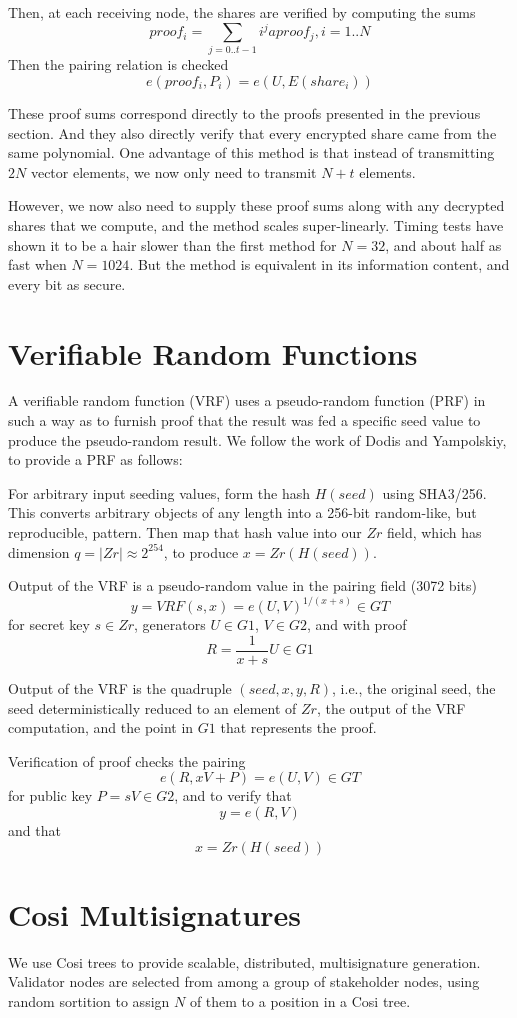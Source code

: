 \documentclass[article,oneside]{memoir}
\begin{document}
Then, at each receiving node, the shares are verified by computing the sums
$$ proof_i = \sum_{j=0..t-1} i^j aproof_j, i = 1..N$$
Then the pairing relation is checked
$$e(proof_i, P_i) = e(U,E(share_i))$$

These proof sums correspond directly to the proofs presented in the previous section. And they also directly verify that every encrypted share came from the same polynomial. One advantage of this method is that instead of transmitting $2 N$ vector elements, we now only need to transmit $N+t$ elements.

However, we now also need to supply these proof sums along with any decrypted shares that we compute, and the method scales super-linearly. Timing tests have shown it to be a hair slower than the first method for $N=32$, and about half as fast when $N=1024$. But the method is equivalent in its information content, and every bit as secure.

\chapter{Verifiable Random Functions}
A verifiable random function (VRF)\cite{vrf2} uses a pseudo-random function (PRF) in such a way as to furnish proof that the result was fed a specific seed value to produce the pseudo-random result. We follow the work of Dodis and Yampolskiy\cite{vrf}, to provide a PRF as follows:

For arbitrary input seeding values, form the hash $H(seed)$ using SHA3/256. This converts arbitrary objects of any length into a 256-bit random-like, but reproducible, pattern. Then map that hash value into our $Zr$ field, which has dimension $q = |Zr| \approx 2^{254}$, to produce $x = Zr(H(seed))$.

Output of the VRF is a pseudo-random value in the pairing field (3072 bits) $$y = VRF(s, x) = e(U,V)^{1/(x + s)} \in GT$$ for secret key $s \in Zr$,  generators $U \in G1$, $V \in G2$, and with proof $$R = \frac{1}{x+s}U \in G1$$ 

Output of the VRF is the quadruple $(seed, x, y, R)$, i.e., the original seed, the seed deterministically reduced to an element of $Zr$, the output of the VRF computation, and the point in $G1$ that represents the proof.

Verification of proof checks the pairing $$e(R, x V + P) = e(U,V)  \in GT$$ for public key $P = s V \in G2$, and to verify that $$y = e(R,V)$$ and that $$x = Zr(H(seed))$$

\chapter{Cosi Multisignatures}
We use Cosi trees\cite{cosi} to provide scalable, distributed, multisignature generation. Validator nodes are selected from among a group of stakeholder nodes, using random sortition to assign $N$ of them to a position in a Cosi tree. 
\end{document}
